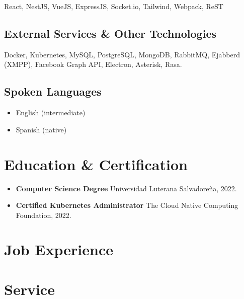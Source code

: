 \documentclass{article}
\begin{document}
React, NestJS, VueJS, ExpressJS, Socket.io, Tailwind, Webpack, ReST

\subsection{External Services \& Other Technologies}

Docker, Kubernetes, MySQL, PostgreSQL, MongoDB, RabbitMQ, Ejabberd (XMPP), Facebook Graph API, Electron, Asterisk, Rasa.

\subsection{Spoken Languages}

\begin{itemize}
	\item English (intermediate)
	\item Spanish (native)
\end{itemize}

\section{Education \& Certification}

\begin{itemize}
	\item \textbf{Computer Science Degree} \newline Universidad Luterana Salvadoreña, 2022.

	\item \textbf{Certified Kubernetes Administrator} \newline The Cloud Native Computing Foundation, 2022.
\end{itemize}



\section{Job Experience}

\section{Service}
\end{document}
